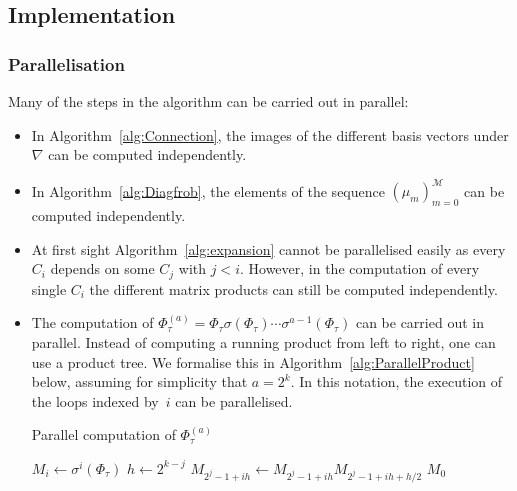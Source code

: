 \documentclass[a4paper,11pt]{article}
\numberwithin{equation}{section}
\theoremstyle{definition}
\begin{document}
\subsection{Implementation}

\subsubsection{Parallelisation}

Many of the steps in the algorithm can be
carried out in parallel:
\begin{itemize}
\item In Algorithm~\ref{alg:Connection}, the images of the different 
      basis vectors under $\nabla$ can be computed independently.
\item In Algorithm~\ref{alg:Diagfrob}, the elements of the sequence 
      $(\mu_m)_{m=0}^{\mathcal{M}}$ can be computed independently.
\item At first sight Algorithm~\ref{alg:expansion} cannot be parallelised easily 
      as every $C_{i}$ depends on some $C_{j}$ with $j < i$. However, in
      the computation of every single $C_i$ the different matrix products can
      still be computed independently.
\item The computation of 
      $\Phi_{\tau}^{(a)}=\Phi_{\tau} \sigma(\Phi_{\tau}) \dotsm \sigma^{a-1}(\Phi_{\tau})$ 
      can be carried out in parallel.  Instead of computing 
      a running product from left to right, one can use a 
      product tree.  We formalise this in Algorithm~\ref{alg:ParallelProduct} below, 
      assuming for simplicity that $a = 2^k$.  In this notation, the execution 
      of the loops indexed by~$i$ can be parallelised.
      \begin{algorithm}
      \caption{Parallel computation of $\Phi_{\tau}^{(a)}$}
      \label{alg:ParallelProduct}
      \begin{algorithmic}
      \vspace{1mm}
          \State $M_i \gets \sigma^{i}(\Phi_{\tau})$
      \EndFor
          \State $h \gets 2^{k-j}$
          \State $M_{2^j-1 + ih} \gets M_{2^j-1 + i h} M_{2^j-1 + ih + h/2}$
          \EndFor
      \EndFor
      \Return $M_0$
      \end{algorithmic}
      \end{algorithm}
\end{itemize}
\end{document}
